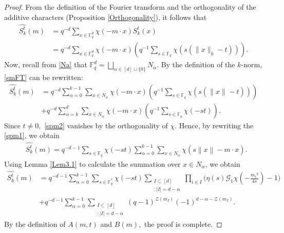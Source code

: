 \documentclass[a4paper,11pt]{amsart}
\numberwithin{equation}{section}
\def\Fq#1{\mathbb{F}_q^{#1}}
\def\norm#1{\left\lVert#1\right\lVert}
\def\knorm#1#2{\lVert#2\rVert_{#1}}
\begin{document}
\begin{proof}
From the definition of the Fourier transform and  the orthogonality of the additive characters (Proposition \ref{Orthogonality}),  it follows that
\begin{align}
\widehat{S_{k}^t} (m) &= q^{-d}\sum_{x\in\Fq{d}} \chi(-m\cdot x)S_{k}^t(x) \nonumber\\
&= q^{-d}\sum_{x\in\Fq{d}} \chi(-m\cdot x)\left(q^{-1}\sum_{s\in\Fq{}}\chi(s(\knorm{k}{x}-t))\right)\label{smFT}. 
\end{align}
Now, recall from \eqref{Na} that $\mathbb F_q^d= \bigsqcup\limits_{\alpha\in [d]\cup \{0\}} N_\alpha$. By the definition of the $k$-norm, \eqref{smFT} can be rewritten:
\begin{align}
\widehat{S_{k}^t} (m)& = q^{-d}\sum_{\alpha=0}^{k-1} \sum_{x\in N_\alpha} \chi(-m\cdot x)\left(q^{-1}\sum_{s\in\Fq{}}\chi(s(\knorm{}{x}-t))\right)  \label{spm1} \\
&+ q^{-d}\sum_{\alpha=k}^{d} \sum_{x\in N_\alpha} \chi(-m\cdot x)\left(q^{-1}\sum_{s\in\Fq{}}\chi(-st)\right).\label{spm2}
\end{align}
   Since $t\ne 0,$  \eqref{spm2} vanishes by the orthogonality of $\chi.$ Hence, by rewriting the \eqref{spm1}, we obtain
\begin{equation}\label{sm3}
\begin{aligned}
&\widehat{S_{k}^t} (m)=q^{-d-1}\sum_{s\in \Fq{}}\chi(-st)\sum_{\alpha=0}^{k-1} \sum_{x\in N_\alpha}\chi(s\norm{x}-m\cdot x).
\end{aligned}
\end{equation}
Using Lemma \ref{Lem3.1} to calculate the summation over $x\in N_\alpha$,  we obtain 
\begin{align*}
\widehat{S_{k}^t} (m) &=q^{-d-1}\sum_{\alpha = 0}^{k-1}\sum_{s\in\Fq{*}}\chi(-st)\sum_{\substack{{I \subset [d]}\\{:|I| = d-\alpha}}} \prod_{i \in I}\bigg(\eta(s)\mathcal{G}_1\chi\left(-\frac{{m_i}^2}{4s}\right)-1\bigg)\\
&+q^{-d-1}\sum_{\alpha = 0}^{k-1}\sum_{\substack{{I \subset [d]}\\{:|I| = d-\alpha}}}(q-1)^{\mathcal{Z}(m_{I})}(-1)^{d-\alpha-\mathcal{Z}(m_I)}.
\end{align*}
By the definition of $A(m,t)$ and $B(m),$ the proof is complete. 
\end{proof}
\end{document}
